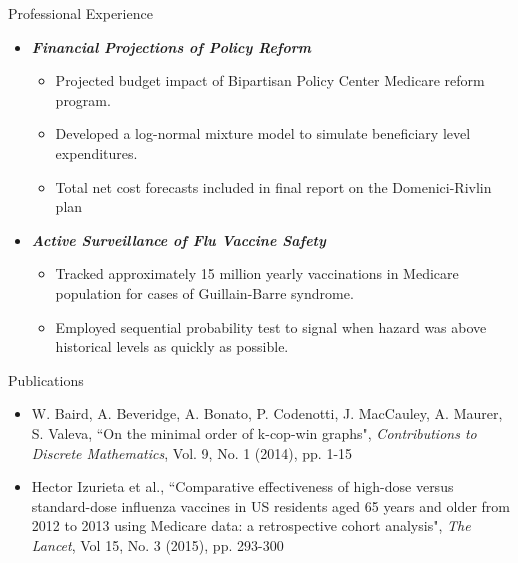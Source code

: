 \documentclass{resume} %
\begin{document}
\begin{rSection}{Professional Experience}
\begin{itemize}
\begin{itemize}
    	\item {\bf \em Financial Projections of Policy Reform}
        \begin{itemize} \itemsep -0.2em
    		\item Projected budget impact of Bipartisan Policy Center Medicare reform program.
            \item Developed a log-normal mixture model to simulate beneficiary level expenditures.
            \item Total net cost forecasts included in final report on the Domenici-Rivlin plan
    	\end{itemize}
        \item {\bf \em Active Surveillance of Flu Vaccine Safety}
        \begin{itemize} \itemsep -0.2em
        	\item Tracked approximately 15 million yearly vaccinations in Medicare population for cases of Guillain-Barre syndrome.
            \item Employed sequential probability test to signal when hazard was above historical levels as quickly as possible.
        \end{itemize}
    \end{itemize}
\end{itemize}
\end{rSection}

\vspace{0.4em}


\begin{rSection}{Publications}
\begin{itemize}
    \item W. Baird, A. Beveridge, A. Bonato, P. Codenotti, J. MacCauley, A. Maurer, S. Valeva, ``On the minimal order of k-cop-win graphs", {\em Contributions to Discrete Mathematics}, Vol. 9, No. 1 (2014), pp. 1-15 
    \item Hector Izurieta et al., ``Comparative effectiveness of high-dose versus standard-dose influenza vaccines in US residents aged 65 years and older from 2012 to 2013 using Medicare data: a retrospective cohort analysis", {\em The Lancet}, Vol 15, No. 3 (2015), pp. 293-300 
\end{itemize}
\end{rSection}
\end{document}
